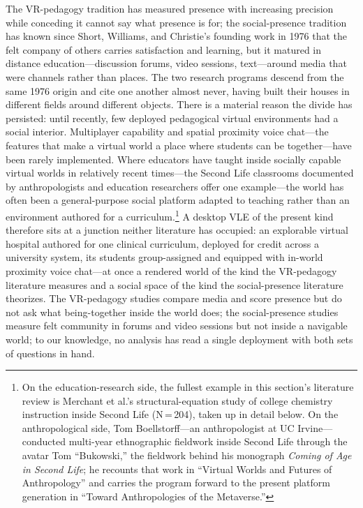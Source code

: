 The VR-pedagogy tradition has measured presence with increasing precision while
conceding it cannot say what presence is for; the social-presence tradition has
known since Short, Williams, and Christie's founding work in 1976 that the felt
company of others carries satisfaction and learning, but it matured in distance
education---discussion forums, video sessions, text---around media that were
channels rather than places. The two research programs descend from the same
1976 origin and cite one another almost never, having built their houses in
different fields around different objects. There is a material reason the
divide has persisted: until recently, few deployed pedagogical virtual
environments had a social interior. Multiplayer capability and spatial
proximity voice chat---the features that make a virtual world a place where
students can be together---have been rarely implemented. Where educators
have taught inside socially capable virtual worlds in relatively recent
times---the Second Life classrooms documented by anthropologists and education
researchers offer one example---the world has often been a general-purpose
social platform adapted to teaching rather than an environment authored for a
curriculum.\footnote{On the education-research side, the fullest example in
this section's literature review is Merchant et al.'s structural-equation study
of college chemistry instruction inside Second Life (N\,=\,204), taken up in
detail below. On the anthropological side, Tom Boellstorff---an anthropologist
at UC Irvine---conducted multi-year ethnographic fieldwork inside Second Life
through the avatar Tom ``Bukowski,'' the fieldwork behind his monograph
\textit{Coming of Age in Second Life}; he recounts that work in ``Virtual
Worlds and Futures of Anthropology'' and carries the program forward to the
present platform generation in ``Toward Anthropologies of the Metaverse.''} A
desktop VLE of the present kind therefore sits at a junction
neither literature has occupied: an explorable virtual hospital authored for one
clinical curriculum, deployed for credit across a university system, its
students group-assigned and equipped with in-world proximity voice chat---at
once a
rendered world of the kind the VR-pedagogy literature measures and a social
space of the kind the social-presence literature theorizes. The VR-pedagogy
studies compare media and score presence but do not ask what being-together
inside the world does; the social-presence studies measure felt community in
forums and video sessions but not inside a navigable world; to our knowledge, no
analysis has read a single deployment with both sets of questions in hand.
